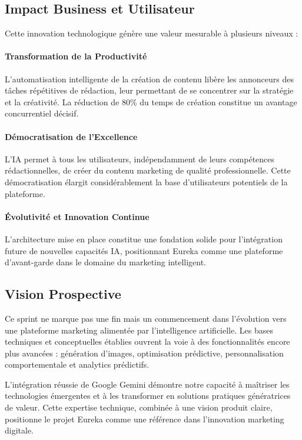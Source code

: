 \subsection{Impact Business et Utilisateur}

Cette innovation technologique génère une valeur mesurable à plusieurs niveaux :

\paragraph{Transformation de la Productivité}
L'automatisation intelligente de la création de contenu libère les annonceurs des tâches répétitives de rédaction, leur permettant de se concentrer sur la stratégie et la créativité. La réduction de 80\% du temps de création constitue un avantage concurrentiel décisif.

\paragraph{Démocratisation de l'Excellence}
L'IA permet à tous les utilisateurs, indépendamment de leurs compétences rédactionnelles, de créer du contenu marketing de qualité professionnelle. Cette démocratisation élargit considérablement la base d'utilisateurs potentiels de la plateforme.

\paragraph{Évolutivité et Innovation Continue}
L'architecture mise en place constitue une fondation solide pour l'intégration future de nouvelles capacités IA, positionnant Eureka comme une plateforme d'avant-garde dans le domaine du marketing intelligent.

\subsection{Vision Prospective}

Ce sprint ne marque pas une fin mais un commencement dans l'évolution vers une plateforme marketing alimentée par l'intelligence artificielle. Les bases techniques et conceptuelles établies ouvrent la voie à des fonctionnalités encore plus avancées : génération d'images, optimisation prédictive, personnalisation comportementale et analytics prédictifs.

L'intégration réussie de Google Gemini démontre notre capacité à maîtriser les technologies émergentes et à les transformer en solutions pratiques génératrices de valeur. Cette expertise technique, combinée à une vision produit claire, positionne le projet Eureka comme une référence dans l'innovation marketing digitale.
